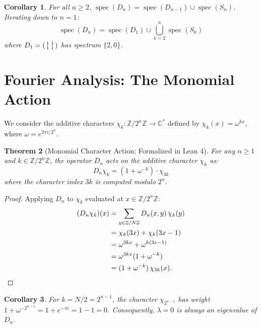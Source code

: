 \documentclass[11pt,reqno]{amsart}
\newtheorem{theorem}{Theorem}[section]
\newtheorem{corollary}[theorem]{Corollary}
\theoremstyle{definition}
\begin{document}
\begin{corollary}\label{cor:spec-decomp}
For all $n \ge 2$, $\operatorname{spec}(D_n) = \operatorname{spec}(D_{n-1}) \cup \operatorname{spec}(S_n)$. Iterating down to $n = 1$:
\[
\operatorname{spec}(D_n) = \operatorname{spec}(D_1) \cup \bigcup_{k=2}^{n} \operatorname{spec}(S_k)
\]
where $D_1 = \begin{psmallmatrix} 1 & 1 \\ 1 & 1 \end{psmallmatrix}$ has spectrum $\{2, 0\}$.
\end{corollary}

\section{Fourier Analysis: The Monomial Action}\label{sec:fourier}

We consider the additive characters $\chi_k \colon \mathbb{Z}/2^n\mathbb{Z} \to \mathbb{C}^*$ defined by $\chi_k(x) = \omega^{kx}$, where $\omega = e^{2\pi i / 2^n}$.

\begin{theorem}[Monomial Character Action; Formalized in Lean 4]\label{thm:monomial}
For any $n \ge 1$ and $k \in \mathbb{Z}/2^n\mathbb{Z}$, the operator $D_n$ acts on the additive character $\chi_k$ as:
\[
D_n \chi_k = (1 + \omega^{-k}) \cdot \chi_{3k}
\]
where the character index $3k$ is computed modulo $2^n$.
\end{theorem}

\begin{proof}
Applying $D_n$ to $\chi_k$ evaluated at $x \in \mathbb{Z}/2^n\mathbb{Z}$:
\begin{align*}
(D_n \chi_k)(x) &= \sum_{y \in \mathbb{Z}/N\mathbb{Z}} D_n(x, y) \, \chi_k(y) \\
&= \chi_k(3x) + \chi_k(3x - 1) \\
&= \omega^{3kx} + \omega^{k(3x - 1)} \\
&= \omega^{3kx}(1 + \omega^{-k}) \\
&= (1 + \omega^{-k}) \, \chi_{3k}(x). \qedhere
\end{align*}
\end{proof}

\begin{corollary}\label{cor:weight-zero}
For $k = N/2 = 2^{n-1}$, the character $\chi_{2^{n-1}}$ has weight $1 + \omega^{-2^{n-1}} = 1 + e^{-\pi i} = 1 - 1 = 0$. Consequently, $\lambda = 0$ is always an eigenvalue of $D_n$.
\end{corollary}
\end{document}
